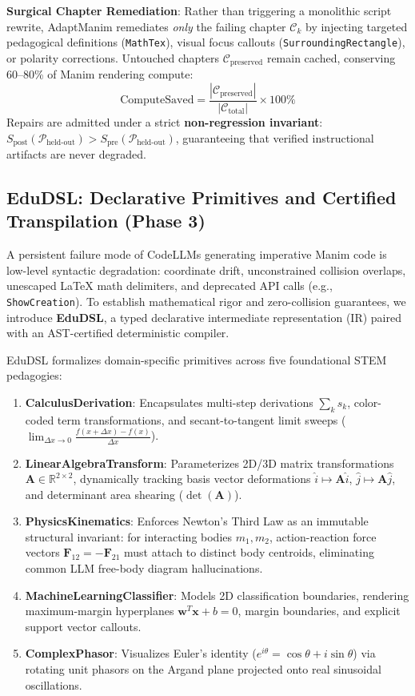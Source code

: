 \documentclass{article}
\begin{document}
\textbf{Surgical Chapter Remediation}: Rather than triggering a monolithic script rewrite, AdaptManim remediates \textit{only} the failing chapter $\mathcal{C}_k$ by injecting targeted pedagogical definitions (\texttt{MathTex}), visual focus callouts (\texttt{SurroundingRectangle}), or polarity corrections. Untouched chapters $\mathcal{C}_{\text{preserved}}$ remain cached, conserving 60--80\% of Manim rendering compute:
\begin{equation}
    \text{ComputeSaved} = \frac{|\mathcal{C}_{\text{preserved}}|}{|\mathcal{C}_{\text{total}}|} \times 100\%
\end{equation}
Repairs are admitted under a strict \textbf{non-regression invariant}: $S_{\text{post}}(\mathcal{P}_{\text{held-out}}) > S_{\text{pre}}(\mathcal{P}_{\text{held-out}})$, guaranteeing that verified instructional artifacts are never degraded.

\subsection{EduDSL: Declarative Primitives and Certified Transpilation (Phase 3)}
\label{subsec:edudsl}
A persistent failure mode of CodeLLMs generating imperative Manim code is low-level syntactic degradation: coordinate drift, unconstrained collision overlaps, unescaped \LaTeX{} math delimiters, and deprecated API calls (e.g., \texttt{ShowCreation}). To establish mathematical rigor and zero-collision guarantees, we introduce \textbf{EduDSL}, a typed declarative intermediate representation (IR) paired with an AST-certified deterministic compiler.

EduDSL formalizes domain-specific primitives across five foundational STEM pedagogies:
\begin{enumerate}
    \item \textbf{CalculusDerivation}: Encapsulates multi-step derivations $\sum_k s_k$, color-coded term transformations, and secant-to-tangent limit sweeps ($\lim_{\Delta x \to 0} \frac{f(x+\Delta x)-f(x)}{\Delta x}$).
    \item \textbf{LinearAlgebraTransform}: Parameterizes 2D/3D matrix transformations $\mathbf{A} \in \mathbb{R}^{2\times 2}$, dynamically tracking basis vector deformations $\hat{i} \mapsto \mathbf{A}\hat{i}$, $\hat{j} \mapsto \mathbf{A}\hat{j}$, and determinant area shearing ($\det(\mathbf{A})$).
    \item \textbf{PhysicsKinematics}: Enforces Newton's Third Law as an immutable structural invariant: for interacting bodies $m_1, m_2$, action-reaction force vectors $\mathbf{F}_{12} = -\mathbf{F}_{21}$ must attach to distinct body centroids, eliminating common LLM free-body diagram hallucinations.
    \item \textbf{MachineLearningClassifier}: Models 2D classification boundaries, rendering maximum-margin hyperplanes $\mathbf{w}^T\mathbf{x} + b = 0$, margin boundaries, and explicit support vector callouts.
    \item \textbf{ComplexPhasor}: Visualizes Euler's identity ($e^{i\theta} = \cos\theta + i\sin\theta$) via rotating unit phasors on the Argand plane projected onto real sinusoidal oscillations.
\end{enumerate}
\end{document}
